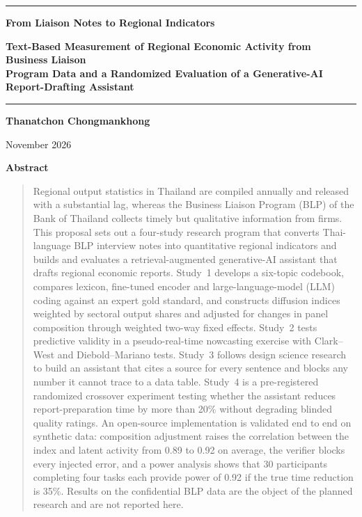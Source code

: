 \documentclass[11pt]{article}
\begin{document}
\thispagestyle{firstpage}

\begin{center}
\rule{\linewidth}{2.5pt}\par\vspace{0.7em}
{\LARGE\bfseries From Liaison Notes to Regional Indicators\par}
\vspace{0.45em}
{\large\bfseries Text-Based Measurement of Regional Economic Activity from Business Liaison\\[0.15em]
Program Data and a Randomized Evaluation of a Generative-AI Report-Drafting Assistant\par}
\vspace{0.6em}\rule{\linewidth}{0.8pt}\par\vspace{1.3em}
{\large\bfseries Thanatchon Chongmankhong}\par\vspace{0.35em}
{\small November 2026}
\end{center}

\vspace{0.6em}
\begin{center}{\large\bfseries Abstract}\end{center}
\vspace{-0.6em}
\begin{quote}
\small
Regional output statistics in Thailand are compiled annually and released with a substantial lag, whereas the Business Liaison Program (BLP) of the Bank of Thailand collects timely but qualitative information from firms. This proposal sets out a four-study research program that converts Thai-language BLP interview notes into quantitative regional indicators and builds and evaluates a retrieval-augmented generative-AI assistant that drafts regional economic reports. Study~1 develops a six-topic codebook, compares lexicon, fine-tuned encoder and large-language-model (LLM) coding against an expert gold standard, and constructs diffusion indices weighted by sectoral output shares and adjusted for changes in panel composition through weighted two-way fixed effects. Study~2 tests predictive validity in a pseudo-real-time nowcasting exercise with Clark--West and Diebold--Mariano tests. Study~3 follows design science research to build an assistant that cites a source for every sentence and blocks any number it cannot trace to a data table. Study~4 is a pre-registered randomized crossover experiment testing whether the assistant reduces report-preparation time by more than 20\% without degrading blinded quality ratings. An open-source implementation is validated end to end on synthetic data: composition adjustment raises the correlation between the index and latent activity from 0.89 to 0.92 on average, the verifier blocks every injected error, and a power analysis shows that 30 participants completing four tasks each provide power of 0.92 if the true time reduction is 35\%. Results on the confidential BLP data are the object of the planned research and are not reported here.
\end{quote}
\end{document}
